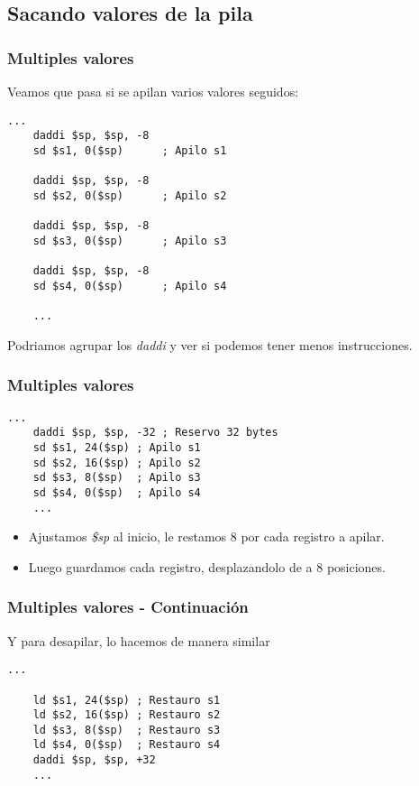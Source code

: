 \documentclass{beamer}
\begin{document}
\subsection{Sacando valores de la pila}
\begin{frame}[fragile]
\frametitle{Multiples valores}
Veamos que pasa si se apilan varios valores seguidos:

\tiny{
\begin{block}{}
\begin{lstlisting}[basicstyle=\ttfamily,keywordstyle=\color{blue}]
    ...
    daddi $sp, $sp, -8
    sd $s1, 0($sp)      ; Apilo s1
	
    daddi $sp, $sp, -8
    sd $s2, 0($sp)      ; Apilo s2
	
    daddi $sp, $sp, -8
    sd $s3, 0($sp)      ; Apilo s3
	
    daddi $sp, $sp, -8
    sd $s4, 0($sp)      ; Apilo s4

    ...
\end{lstlisting}
\end{block}
}

Podriamos agrupar los \emph{daddi} y ver si podemos tener menos instrucciones.

\end{frame}


\begin{frame}[fragile]
\frametitle{Multiples valores}
\tiny{
\begin{block}{}
\begin{lstlisting}[basicstyle=\ttfamily,keywordstyle=\color{blue}]
    ...
    daddi $sp, $sp, -32 ; Reservo 32 bytes
    sd $s1, 24($sp) ; Apilo s1
    sd $s2, 16($sp) ; Apilo s2
    sd $s3, 8($sp)  ; Apilo s3
    sd $s4, 0($sp)  ; Apilo s4
    ...
\end{lstlisting}
\end{block}
}
\begin{itemize}
\item Ajustamos \emph{\$sp} al inicio, le restamos 8 por cada registro a apilar.
\item Luego guardamos cada registro, desplazandolo de a 8 posiciones.
\end{itemize}

\end{frame}


\begin{frame}[fragile]
\frametitle{Multiples valores - Continuación}
Y para desapilar, lo hacemos de manera similar
\tiny{
\begin{block}{}
\begin{lstlisting}[basicstyle=\ttfamily,keywordstyle=\color{blue}]
    ...

    ld $s1, 24($sp) ; Restauro s1
    ld $s2, 16($sp) ; Restauro s2
    ld $s3, 8($sp)  ; Restauro s3
    ld $s4, 0($sp)  ; Restauro s4
    daddi $sp, $sp, +32
    ...
\end{lstlisting}
\end{block}
}
\end{frame}
\end{document}
